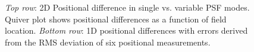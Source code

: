 \documentclass[]{spie}  %
\begin{document}
\begin{figure}[!h]
 \caption{\footnotesize \textit{Top row}: 2D Positional difference in single vs. variable PSF modes. Quiver plot shows positional differences as a function of field location. \textit{Bottom row}: 1D positional differences with errors derived from the RMS deviation of six positional measurements.} \label{fig:gc-gq-astrom}
\end{figure}
\end{document}

